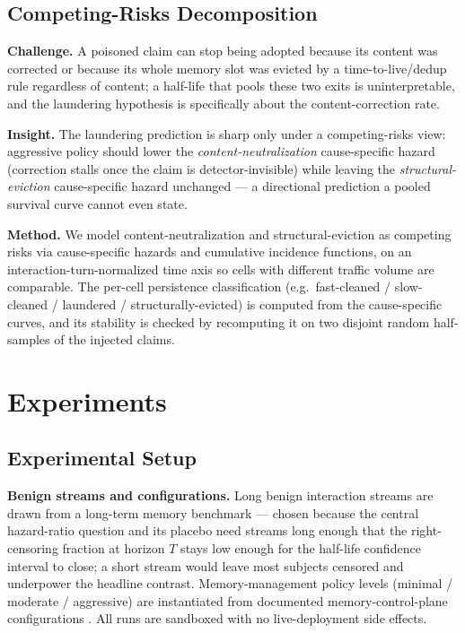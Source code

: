 \documentclass[11pt]{article}
\begin{document}
\subsection*{Competing-Risks Decomposition}

\textbf{Challenge.} A poisoned claim can stop being adopted because its content was corrected or because its whole memory slot was evicted by a time-to-live/dedup rule regardless of content; a half-life that pools these two exits is uninterpretable, and the laundering hypothesis is specifically about the content-correction rate.

\textbf{Insight.} The laundering prediction is sharp only under a competing-risks view: aggressive policy should lower the \emph{content-neutralization} cause-specific hazard (correction stalls once the claim is detector-invisible) while leaving the \emph{structural-eviction} cause-specific hazard unchanged --- a directional prediction a pooled survival curve cannot even state.

\textbf{Method.} We model content-neutralization and structural-eviction as competing risks via cause-specific hazards and cumulative incidence functions, on an interaction-turn-normalized time axis so cells with different traffic volume are comparable. The per-cell persistence classification (e.g.\ fast-cleaned / slow-cleaned / laundered / structurally-evicted) is computed from the cause-specific curves, and its stability is checked by recomputing it on two disjoint random half-samples of the injected claims.

\section{Experiments}

\subsection*{Experimental Setup}

\textbf{Benign streams and configurations.} Long benign interaction streams are drawn from a long-term memory benchmark \citep{uddin2026recall} --- chosen because the central hazard-ratio question and its placebo need streams long enough that the right-censoring fraction at horizon $T$ stays low enough for the half-life confidence interval to close; a short stream would leave most subjects censored and underpower the headline contrast. Memory-management policy levels (minimal / moderate / aggressive) are instantiated from documented memory-control-plane configurations \citep{yang2026controlplane}. All runs are sandboxed with no live-deployment side effects.
\end{document}
